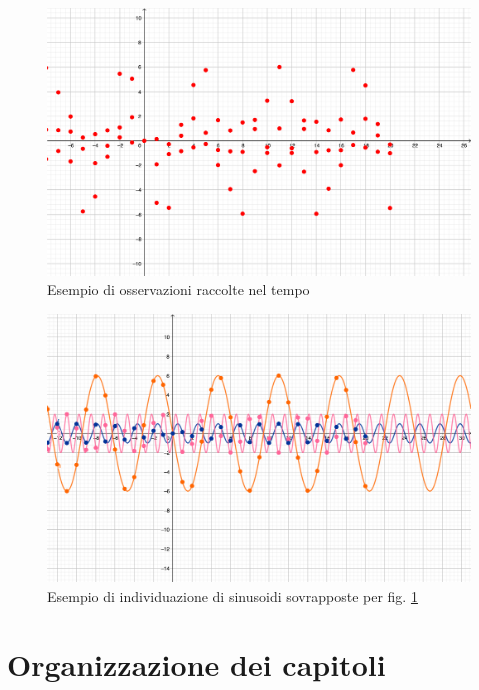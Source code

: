 \documentclass[a4paper,12pt]{report}
\begin{document}
\begin{figure}[H]
  \caption{Esempio di osservazioni raccolte nel tempo}
  \label{fig:generalizzazione}
  \begin{center}
  \includegraphics[scale=0.35]{img/utility/generalizzazione.png}
  \end{center}
\end{figure}

\begin{figure}[H]
  \caption{Esempio di individuazione di sinusoidi sovrapposte per fig. \ref{fig:generalizzazione}}
  \begin{center}
  \includegraphics[scale=0.35]{img/utility/generalizzazione2.png}
  \end{center}
\end{figure}

\section{Organizzazione dei capitoli}
\end{document}

